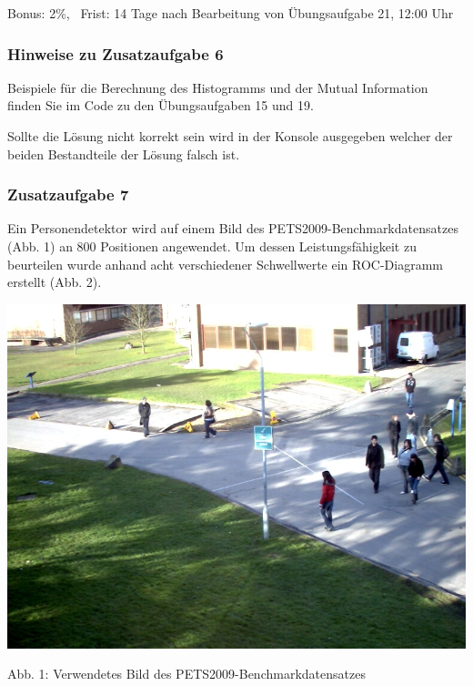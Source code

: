 \documentclass[11pt]{article}
\makeatletter
\def\maxwidth{\ifdim\Gin@nat@width>\linewidth\linewidth
    \else\Gin@nat@width\fi}
\let\Oldincludegraphics\includegraphics
\renewcommand{\includegraphics}[1]{\Oldincludegraphics[width=.8\maxwidth]{#1}}
\makeatother
\begin{document}
    Bonus: 2\%,\(\;\;\;\)Frist: 14 Tage nach Bearbeitung von Übungsaufgabe
21, 12:00 Uhr

\subsubsection{Hinweise zu Zusatzaufgabe
6}\label{hinweise-zu-zusatzaufgabe-6}

Beispiele für die Berechnung des Histogramms und der Mutual Information
finden Sie im Code zu den Übungsaufgaben 15 und 19.

Sollte die Lösung nicht korrekt sein wird in der Konsole ausgegeben
welcher der beiden Bestandteile der Lösung falsch ist.

\subsubsection{Zusatzaufgabe 7}\label{zusatzaufgabe-7}

Ein Personendetektor wird auf einem Bild des
PETS2009-Benchmarkdatensatzes (Abb. 1) an 800 Positionen angewendet. Um
dessen Leistungsfähigkeit zu beurteilen wurde anhand acht verschiedener
Schwellwerte ein ROC-Diagramm erstellt (Abb. 2).

\includegraphics{PETS2009Example.jpg}

Abb. 1: Verwendetes Bild des PETS2009-Benchmarkdatensatzes
\end{document}

